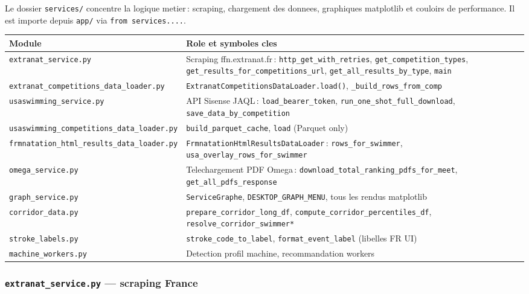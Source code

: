 \documentclass[11pt,a4paper]{article}
\begin{document}
Le dossier \texttt{services/} concentre la logique metier\,: scraping, chargement des donnees, graphiques matplotlib et couloirs de performance. Il est importe depuis \texttt{app/} via \texttt{from services....}.

\begin{longtable}{@{}p{}p{}@{}}
\toprule
\textbf{Module} & \textbf{Role et symboles cles} \\
\midrule
\endhead
\texttt{extranat\_service.py} & Scraping ffn.extranat.fr\,: \texttt{http\_get\_with\_retries}, \texttt{get\_competition\_types}, \texttt{get\_results\_for\_competitions\_url}, \texttt{get\_all\_results\_by\_type}, \texttt{main} \\
\texttt{extranat\_competitions\_data\_loader.py} & \texttt{ExtranatCompetitionsDataLoader.load()}, \texttt{\_build\_rows\_from\_comp} \\
\texttt{usaswimming\_service.py} & API Sisense JAQL\,: \texttt{load\_bearer\_token}, \texttt{run\_one\_shot\_full\_download}, \texttt{save\_data\_by\_competition} \\
\texttt{usaswimming\_competitions\_data\_loader.py} & \texttt{build\_parquet\_cache}, \texttt{load} (Parquet only) \\
\texttt{frmnatation\_html\_results\_data\_loader.py} & \texttt{FrmnatationHtmlResultsDataLoader}\,: \texttt{rows\_for\_swimmer}, \texttt{usa\_overlay\_rows\_for\_swimmer} \\
\texttt{omega\_service.py} & Telechargement PDF Omega\,: \texttt{download\_total\_ranking\_pdfs\_for\_meet}, \texttt{get\_all\_pdfs\_response} \\
\texttt{graph\_service.py} & \texttt{ServiceGraphe}, \texttt{DESKTOP\_GRAPH\_MENU}, tous les rendus matplotlib \\
\texttt{corridor\_data.py} & \texttt{prepare\_corridor\_long\_df}, \texttt{compute\_corridor\_percentiles\_df}, \texttt{resolve\_corridor\_swimmer*} \\
\texttt{stroke\_labels.py} & \texttt{stroke\_code\_to\_label}, \texttt{format\_event\_label} (libelles FR UI) \\
\texttt{machine\_workers.py} & Detection profil machine, recommandation workers \\
\bottomrule
\end{longtable}

\subsubsection{\texttt{extranat\_service.py} --- scraping France}
\end{document}
